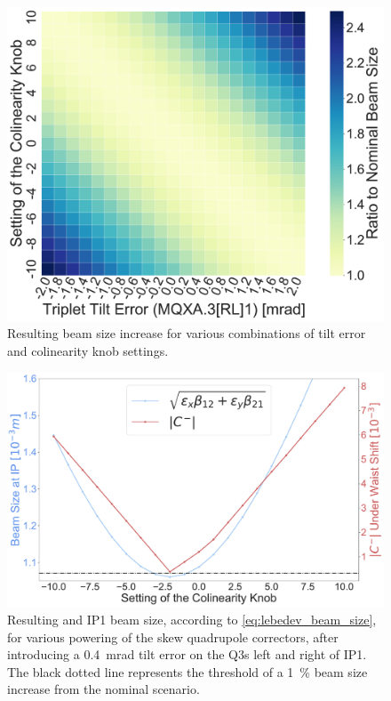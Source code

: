 \begin{figure}[!htb]
    \centering
    \includegraphics*[width=0.99\columnwidth]{Figures/Chapter4/beam_size_colin_compensation.pdf}
    \caption{Resulting beam size increase for various combinations of tilt error and colinearity knob settings.}
    \label{fig:beam_size_comp}
\end{figure}

\begin{figure}[!htb]
    \centering
    \includegraphics*[width=0.99\columnwidth]{Figures/Chapter4/colin_correct_dqmin_lebedev_tilt4e-4.pdf}
    \caption{Resulting \AbsCminus and IP1 beam size, according to \cref{eq:lebedev_beam_size}, for various powering of the skew quadrupole correctors, after introducing a \qty{0.4}{\milli\radian} tilt error on the Q3s left and right of IP1. The black dotted line represents the threshold of a \qty{1}{\percent} beam size increase from the nominal scenario.}
    \label{fig:colin_correction_dqmin_lebedev}
\end{figure}

